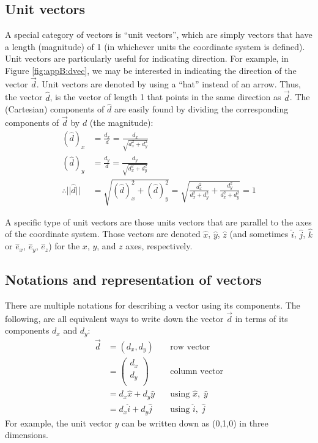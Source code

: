 \subsection{Unit vectors} 
A special category of vectors is ``unit vectors'', which are simply vectors that have a length (magnitude) of 1 (in whichever units the coordinate system is defined). Unit vectors are particularly useful for indicating direction. For example, in Figure \ref{fig:appB:dvec}, we may be interested in indicating the direction of the vector $\vec d$. Unit vectors are denoted by using a ``hat'' instead of an arrow. Thus, the vector $\hat d$, is the vector of length 1 that points in the same direction as $\vec d$. The (Cartesian) components of $\hat d$ are easily found by dividing the corresponding components of $\vec d$ by $d$ (the magnitude):
\begin{align*}
(\hat d)_x &= \frac{d_x}{d}=\frac{d_x}{\sqrt{d_x^2+d_y^2}}\\
(\hat d)_y &= \frac{d_y}{d}=\frac{d_y}{\sqrt{d_x^2+d_y^2}}\\
\therefore ||\hat d||&=\sqrt{(\hat d)_x^2+(\hat d)_y^2}=\sqrt{\frac{d_x^2}{d_x^2+d_y^2}+\frac{d_y^2}{d_x^2+d_y^2}}=1
\end{align*}

A specific type of unit vectors are those units vectors that are parallel to the axes of the coordinate system. Those vectors are denoted $\hat x$, $\hat y$, $\hat z$ (and sometimes $\hat i$, $\hat j$, $\hat k$ or $\hat e_x$, $\hat e_y$, $\hat e_z$) for the $x$, $y$, and $z$ axes, respectively. 

\subsection{Notations and representation of vectors}
There are multiple notations for describing a vector using its components. The following, are all equivalent ways to write down the vector $\vec d$ in terms of its components $d_x$ and $d_y$:
\begin{align*}
\vec d &= (d_x,d_y)\quad&\text{row vector}\\
       &=\begin{pmatrix}
           d_x \\
           d_y \\
         \end{pmatrix}\quad&\text{column vector}\\
         &= d_x\hat x +d_y \hat y\quad&\text{using }\hat x,\;\hat y\\
         &=d_x\hat i +d_y \hat j \quad&\text{using }\hat i,\;\hat j
\end{align*}
For example, the unit vector $\hat y$ can be written down as (0,1,0) in three dimensions. 


